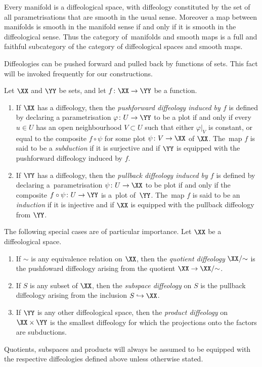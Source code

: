 Every manifold is a diffeological space, with diffeology constituted by the set of all parametrisations that are smooth in the usual sense. Moreover a map between manifolds is smooth in the manifold sense if and only if it is smooth in the diffeological sense. Thus the category of~mani\-folds and smooth maps is a full and faithful subcategory of the category of diffeological spaces and smooth maps.

Diffeologies can be pushed forward and pulled back by functions of sets. This fact will be invoked frequently for our constructions.

\begin{Definition}
Let $\XX$ and $\YY$ be sets, and let $f\colon \XX\rightarrow \YY$ be a function.
\begin{enumerate}\itemsep=0pt
\item If $\XX$ has a diffeology, then the \textit{pushforward diffeology induced by $f$} is defined by declaring a parametrisation $\varphi\colon U\rightarrow \YY$ to be a plot if and only if every $u\in U$ has an open neighbourhood $V\subset U$ such that either $\varphi|_{V}$ is constant, or equal to the composite $f\circ\psi$ for some plot $\psi\colon V\rightarrow \XX$ of $\XX$. The~map $f$ is said to be a \textit{subduction} if it is surjective and if $\YY$ is equipped with the pushforward diffeology induced by $f$.
\item If $\YY$ has a diffeology, then the \textit{pullback diffeology induced by $f$} is defined by declaring a~parametrisation $\psi\colon U\rightarrow \XX$ to be plot if and only if the composite $f\circ\psi\colon U\rightarrow \YY$ is a~plot of~$\YY$. The~map $f$ is said to be an \textit{induction} if it is injective and if $\XX$ is equipped with the pullback diffeology from $\YY$.
\end{enumerate}
The following special cases are of particular importance. Let $\XX$ be a diffeological space.
\begin{enumerate}\itemsep=0pt
\item If $\sim$ is any equivalence relation on $\XX$, then the \textit{quotient diffeology} $\XX/{\sim}$ is the pushfoward diffeology arising from the quotient $\XX\rightarrow \XX/{\sim}$.
\item If $S$ is any subset of $\XX$, then the \textit{subspace diffeology} on $S$ is the pullback diffeology arising from the inclusion $S\hookrightarrow \XX$.
\item If $\YY$ is any other diffeological space, then the \textit{product diffeology} on $\XX\times \YY$ is the smallest diffeology for which the projections onto the factors are subductions.
\end{enumerate}
Quotients, subspaces and products will always be assumed to be equipped with the respective diffeologies defined above unless otherwise stated.
\end{Definition}

